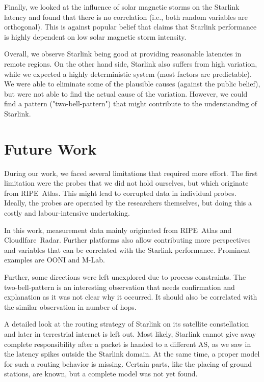 Finally, we looked at the influence of solar magnetic storms on the Starlink
latency and found that there is no correlation (i.e., both random
variables are orthogonal). This is against popular belief that claims that
Starlink performance is highly dependent on low solar magnetic storm intensity.

Overall, we observe Starlink being good at providing reasonable latencies in
remote regions. On the other hand side, Starlink also suffers from high
variation, while we expected a highly deterministic system (most factors are
predictable). We were able to eliminate some of the plausible causes (against
the public belief), but were not able to find the actual cause of the
variation. However, we could find a pattern ("two-bell-pattern") that might
contribute to the understanding of Starlink.

\section{Future Work}

During our work, we faced several limitations that required more effort. The
first limitation were the probes that we did not hold ourselves, but which
originate from RIPE~Atlas. This might lead to corrupted data in individual
probes. Ideally, the probes are operated by the researchers themselves, but
doing this a costly and labour-intensive undertaking.


In this work, measurement data mainly originated from RIPE~Atlas and
Cloudlfare~Radar. Further platforms also allow contributing more perspectives
and variables that can be correlated with the Starlink performance. Prominent
examples are OONI and M-Lab.

Further, some directions were left unexplored due to process constraints. The
two-bell-pattern is an interesting observation that needs confirmation and
explanation as it was not clear why it occurred. It should also be correlated
with the similar observation in number of hops.

A detailed look at the routing strategy of Starlink on its satellite
constellation and later in terrestrial internet is left out. Most likely,
Starlink cannot give away complete responsibility after a packet is handed to a
different AS, as we saw in the latency spikes outside the Starlink domain. At
the same time, a proper model for such a routing behavior is missing. Certain
parts, like the placing of ground stations, are known, but a complete model was
not yet found.

